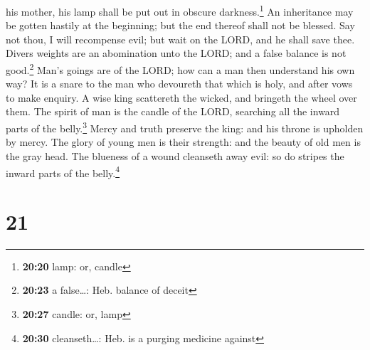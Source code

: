 his mother, his lamp shall be put out in obscure darkness.\footnote{\textbf{20:20}
  lamp: or, candle}  An inheritance may be gotten hastily
at the beginning; but the end thereof shall not be blessed.
 Say not thou, I will recompense evil; but wait on the
LORD, and he shall save thee.  Divers weights are an
abomination unto the LORD; and a false balance is not good.\footnote{\textbf{20:23}
  a false\ldots: Heb. balance of deceit}  Man's goings
are of the LORD; how can a man then understand his own way?
 It is a snare to the man who devoureth that which is
holy, and after vows to make enquiry.  A wise king
scattereth the wicked, and bringeth the wheel over them. 
The spirit of man is the candle of the LORD, searching all the inward
parts of the belly.\footnote{\textbf{20:27} candle: or, lamp}
 Mercy and truth preserve the king: and his throne is
upholden by mercy.  The glory of young men is their
strength: and the beauty of old men is the gray head. 
The blueness of a wound cleanseth away evil: so do stripes the inward
parts of the belly.\footnote{\textbf{20:30} cleanseth\ldots: Heb. is a
  purging medicine against}

\hypertarget{section-20}{%
\section{21}\label{section-20}}

